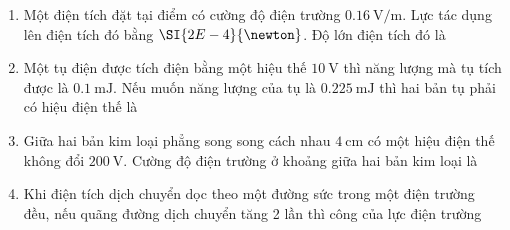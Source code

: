 \begin{enumerate}[label=\bfseries Câu \arabic*:]
\item Một điện tích đặt tại điểm có cường độ điện trường $\SI{0.16}{\volt/\meter}$. Lực tác dụng lên điện tích đó bằng $\SI{2E-4}{\newton}$.  Độ lớn điện tích đó là

\item Một tụ điện được tích điện bằng một hiệu thế $\SI{10}{\volt}$  thì năng lượng mà tụ tích được là $\SI{0.1}{\milli\joule}$. Nếu muốn năng lượng của tụ là $\SI{0.225}{\milli\joule}$ thì hai bản tụ phải có hiệu điện thế là

\item Giữa hai bản kim loại phẳng song song cách nhau $\SI{4}{\centi\meter}$  có một hiệu điện thế không đổi $\SI{200}{\volt}$. Cường độ điện trường ở khoảng giữa hai bản kim loại là

\item Khi điện tích dịch chuyển dọc theo một đường sức trong một điện trường đều, nếu quãng đường dịch chuyển tăng 2 lần thì công của lực điện trường


\end{enumerate}
